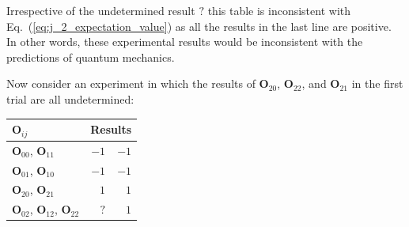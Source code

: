 \documentclass[english,reprint, aps, prl,superscriptaddress, showpacs,
showkeys, longbibliography, amsmath, amssymb, floatfix]{revtex4-1}
\theoremstyle{plain}
\theoremstyle{definition}
\begin{document}
Irrespective of the undetermined result $?$ this table is inconsistent
with Eq.~(\ref{eq:j_2_expectation_value}) as all the results in the
last line are positive. In other words, these experimental results
would be inconsistent with the predictions of quantum mechanics. 

Now consider an experiment in which the results of $\mathbf{O}_{20}$,
$\mathbf{O}_{22}$, and $\mathbf{O}_{21}$ in the first trial are all
undetermined:

\begin{center}
\begin{tabular}{l@{\qquad}r@{\qquad}r}
\toprule 
\addlinespace
$\mathbf{O}_{ij}$  & \multicolumn{2}{c}{Results} \\
\midrule
\midrule 
\addlinespace
$\mathbf{O}_{00}$, $\mathbf{O}_{11}$ & $-1$  & $-1$  \\
\midrule 
\addlinespace
$\mathbf{O}_{01}$, $\mathbf{O}_{10}$ & $-1$  & $-1$  \\
\midrule 
\addlinespace
$\mathbf{O}_{20}$, $\mathbf{O}_{21}$ & $1$  & $1$  \\
\midrule 
\addlinespace
$\mathbf{O}_{02}$, $\mathbf{O}_{12}$, $\mathbf{O}_{22}$ & $?$  & $1$  \\
\bottomrule
\end{tabular}
\par\end{center}

\end{document}
